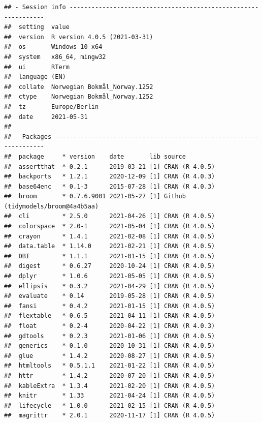 \documentclass[
  11pt,
]{article}
\begin{document}
\begin{verbatim}
## - Session info ---------------------------------------------------------------
##  setting  value                       
##  version  R version 4.0.5 (2021-03-31)
##  os       Windows 10 x64              
##  system   x86_64, mingw32             
##  ui       RTerm                       
##  language (EN)                        
##  collate  Norwegian Bokmål_Norway.1252
##  ctype    Norwegian Bokmål_Norway.1252
##  tz       Europe/Berlin               
##  date     2021-05-31                  
## 
## - Packages -------------------------------------------------------------------
##  package     * version    date       lib source                           
##  assertthat  * 0.2.1      2019-03-21 [1] CRAN (R 4.0.5)                   
##  backports   * 1.2.1      2020-12-09 [1] CRAN (R 4.0.3)                   
##  base64enc   * 0.1-3      2015-07-28 [1] CRAN (R 4.0.3)                   
##  broom       * 0.7.6.9001 2021-05-27 [1] Github (tidymodels/broom@4a4b5aa)
##  cli         * 2.5.0      2021-04-26 [1] CRAN (R 4.0.5)                   
##  colorspace  * 2.0-1      2021-05-04 [1] CRAN (R 4.0.5)                   
##  crayon      * 1.4.1      2021-02-08 [1] CRAN (R 4.0.5)                   
##  data.table  * 1.14.0     2021-02-21 [1] CRAN (R 4.0.5)                   
##  DBI         * 1.1.1      2021-01-15 [1] CRAN (R 4.0.5)                   
##  digest      * 0.6.27     2020-10-24 [1] CRAN (R 4.0.5)                   
##  dplyr       * 1.0.6      2021-05-05 [1] CRAN (R 4.0.5)                   
##  ellipsis    * 0.3.2      2021-04-29 [1] CRAN (R 4.0.5)                   
##  evaluate    * 0.14       2019-05-28 [1] CRAN (R 4.0.5)                   
##  fansi       * 0.4.2      2021-01-15 [1] CRAN (R 4.0.5)                   
##  flextable   * 0.6.5      2021-04-11 [1] CRAN (R 4.0.5)                   
##  float       * 0.2-4      2020-04-22 [1] CRAN (R 4.0.3)                   
##  gdtools     * 0.2.3      2021-01-06 [1] CRAN (R 4.0.5)                   
##  generics    * 0.1.0      2020-10-31 [1] CRAN (R 4.0.5)                   
##  glue        * 1.4.2      2020-08-27 [1] CRAN (R 4.0.5)                   
##  htmltools   * 0.5.1.1    2021-01-22 [1] CRAN (R 4.0.5)                   
##  httr        * 1.4.2      2020-07-20 [1] CRAN (R 4.0.5)                   
##  kableExtra  * 1.3.4      2021-02-20 [1] CRAN (R 4.0.5)                   
##  knitr       * 1.33       2021-04-24 [1] CRAN (R 4.0.5)                   
##  lifecycle   * 1.0.0      2021-02-15 [1] CRAN (R 4.0.5)                   
##  magrittr    * 2.0.1      2020-11-17 [1] CRAN (R 4.0.5)                   

\end{verbatim}
\end{document}
